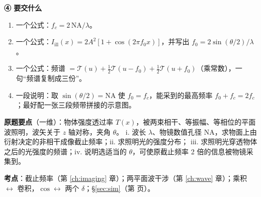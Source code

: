 \begin{idea}[读题：这道题在说什么]
\textbf{④ 要交什么}
\begin{enumerate}[label=\roman*.]
\item 一个公式：$f_c=2\,\mathrm{NA}/\lambda$。
\item 一个公式：$I_{\text{ill}}(x)=2A^2[1+\cos(2\pi f_0x)]$，并写出 $f_0=2\sin(\theta/2)/\lambda$。
\item 一个公式：频谱 $=\mathcal T(u)+\frac12\mathcal T(u-f_0)+\frac12\mathcal T(u+f_0)$（乘常数），一句“频谱复制成三份”。
\item 一段说明：取 $\sin(\theta/2)=\mathrm{NA}$ 使 $f_0=f_c$，能采到的最高频率 $f_0+f_c=2f_c$；最好配一张三段频带拼接的示意图。
\end{enumerate}
\end{idea}

\noindent\textbf{原题要点}（一维）：物体强度透过率 $T(x)$，被两束相干、等振幅、等相位的平面波照明，波矢关于 $z$ 轴对称，夹角 $\theta$。
i. 波长 $\lambda$、物镜数值孔径 NA，求物面上由衍射决定的非相干成像截止频率；ii. 求照明光的强度分布；
iii. 求照明光穿透物体之后的光强度的频谱；iv. 说明选适当的 $\theta$，可使原截止频率 2 倍的信息被物镜采集到。

\textbf{考点}：截止频率（第 \ref{ch:imaging} 章）；两平面波干涉（第 \ref{ch:wave} 章）；乘积 $\leftrightarrow$ 卷积，$\cos\leftrightarrow$ 两个 $\delta$；§\ref{sec:sim}（第 \pageref{sec:sim} 页）。

